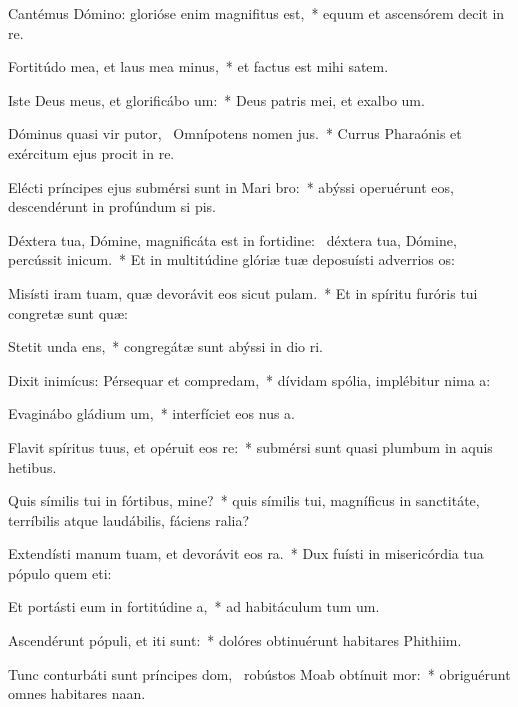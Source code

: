 \item Cantémus Dómino: glorióse enim magnifitus est,~* equum et ascensórem decit in re.
\item Fortitúdo mea, et laus mea minus,~* et factus est mihi  satem.
\item Iste Deus meus, et glorificábo um:~* Deus patris mei, et exalbo um.
\item Dóminus quasi vir putor,~\pscross{} Omnípotens nomen jus.~* Currus Pharaónis et exércitum ejus procit in re.
\item Elécti príncipes ejus submérsi sunt in Mari bro:~* abýssi operuérunt eos, descendérunt in profúndum si pis.
\item Déxtera tua, Dómine, magnificáta est in fortidine:~\pscross{} déxtera tua, Dómine, percússit inicum.~* Et in multitúdine glóriæ tuæ deposuísti adverrios os:
\item Misísti iram tuam, quæ devorávit eos sicut pulam.~* Et in spíritu furóris tui congretæ sunt quæ:
\item Stetit unda ens,~* congregátæ sunt abýssi in dio ri.
\item Dixit inimícus: Pérsequar et compredam,~* dívidam spólia, implébitur nima a:
\item Evaginábo gládium um,~* interfíciet eos nus a.
\item Flavit spíritus tuus, et opéruit eos re:~* submérsi sunt quasi plumbum in aquis hetibus.
\item Quis símilis tui in fórtibus, mine?~* quis símilis tui, magníficus in sanctitáte, terríbilis atque laudábilis, fáciens ralia?
\item Extendísti manum tuam, et devorávit eos ra.~* Dux fuísti in misericórdia tua pópulo quem eti:
\item Et portásti eum in fortitúdine a,~* ad habitáculum tum um.
\item Ascendérunt pópuli, et iti sunt:~* dolóres obtinuérunt habitares Phithiim.
\item Tunc conturbáti sunt príncipes dom,~\pscross{} robústos Moab obtínuit mor:~* obriguérunt omnes habitares naan.
